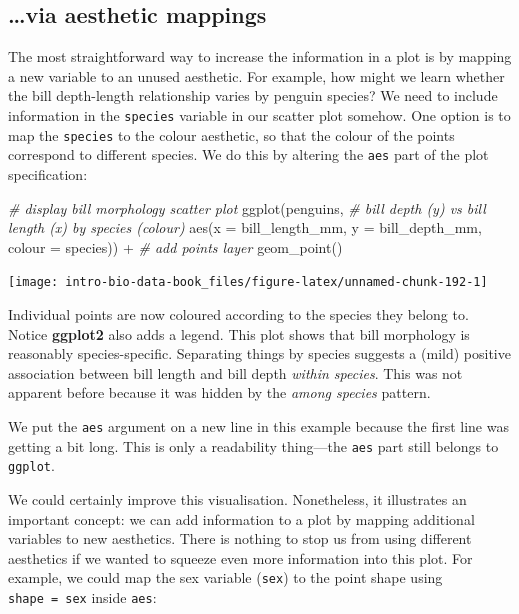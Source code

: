 \documentclass[
]{book}
\newenvironment{Shaded}{\begin{snugshade}}{\end{snugshade}}
\newcommand{\AttributeTok}[1]{\textcolor[rgb]{0.77,0.63,0.00}{#1}}
\newcommand{\CommentTok}[1]{\textcolor[rgb]{0.56,0.35,0.01}{\textit{#1}}}
\newcommand{\FunctionTok}[1]{\textcolor[rgb]{0.00,0.00,0.00}{#1}}
\newcommand{\NormalTok}[1]{#1}
\newcommand{\SpecialCharTok}[1]{\textcolor[rgb]{0.00,0.00,0.00}{#1}}
\begin{document}
\hypertarget{via-aesthetic-mappings}{%
\subsection{\ldots via aesthetic mappings}\label{via-aesthetic-mappings}}

The most straightforward way to increase the information in a plot is by mapping a new variable to an unused aesthetic. For example, how might we learn whether the bill depth-length relationship varies by penguin species? We need to include information in the \texttt{species} variable in our scatter plot somehow. One option is to map the \texttt{species} to the colour aesthetic, so that the colour of the points correspond to different species. We do this by altering the \texttt{aes} part of the plot specification:

\begin{Shaded}
\begin{Highlighting}[]
\CommentTok{\# display bill morphology scatter plot}
\FunctionTok{ggplot}\NormalTok{(penguins, }
       \CommentTok{\# bill depth (y) vs bill length (x) by species (colour)}
       \FunctionTok{aes}\NormalTok{(}\AttributeTok{x =}\NormalTok{ bill\_length\_mm, }\AttributeTok{y =}\NormalTok{ bill\_depth\_mm, }\AttributeTok{colour =}\NormalTok{ species)) }\SpecialCharTok{+} 
  \CommentTok{\# add points layer}
  \FunctionTok{geom\_point}\NormalTok{()}
\end{Highlighting}
\end{Shaded}

\begin{center}\texttt{[image: intro-bio-data-book\_files/figure-latex/unnamed-chunk-192-1]} \end{center}

Individual points are now coloured according to the species they belong to. Notice \textbf{ggplot2} also adds a legend. This plot shows that bill morphology is reasonably species-specific. Separating things by species suggests a (mild) positive association between bill length and bill depth \emph{within species}. This was not apparent before because it was hidden by the \emph{among species} pattern.

We put the \texttt{aes} argument on a new line in this example because the first line was getting a bit long. This is only a readability thing---the \texttt{aes} part still belongs to \texttt{ggplot}.

We could certainly improve this visualisation. Nonetheless, it illustrates an important concept: we can add information to a plot by mapping additional variables to new aesthetics. There is nothing to stop us from using different aesthetics if we wanted to squeeze even more information into this plot. For example, we could map the sex variable (\texttt{sex}) to the point shape using \texttt{shape\ =\ sex} inside \texttt{aes}:
\end{document}
